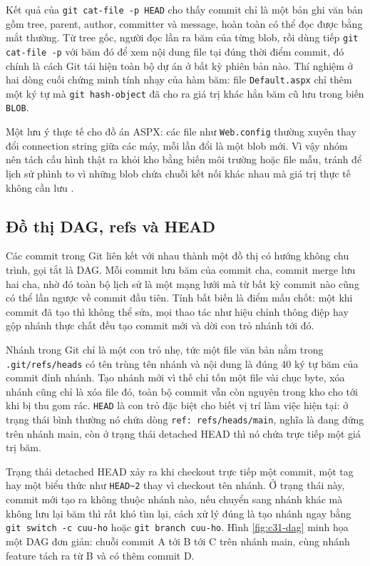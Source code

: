 Kết quả của \verb|git cat-file -p HEAD| cho thấy commit chỉ là một bản ghi văn bản gồm tree, parent, author, committer và message, hoàn toàn có thể đọc được bằng mắt thường.
Từ tree gốc, người đọc lần ra băm của từng blob, rồi dùng tiếp \verb|git cat-file -p| với băm đó để xem nội dung file tại đúng thời điểm commit, đó chính là cách Git tái hiện toàn bộ dự án ở bất kỳ phiên bản nào.
Thí nghiệm ở hai dòng cuối chứng minh tính nhạy của hàm băm: file \verb|Default.aspx| chỉ thêm một ký tự mà \verb|git hash-object| đã cho ra giá trị khác hẳn băm cũ lưu trong biến \verb|BLOB|.

Một lưu ý thực tế cho đồ án ASPX: các file như \verb|Web.config| thường xuyên thay đổi connection string giữa các máy, mỗi lần đổi là một blob mới.
Vì vậy nhóm nên tách cấu hình thật ra khỏi kho bằng biến môi trường hoặc file mẫu, tránh để lịch sử phình to vì những blob chứa chuỗi kết nối khác nhau mà giá trị thực tế không cần lưu \cite{atlassiangit}.

\subsection{Đồ thị DAG, refs và HEAD}
\label{subsec:c31-dag}

Các commit trong Git liên kết với nhau thành một đồ thị có hướng không chu trình, gọi tắt là DAG.
Mỗi commit lưu băm của commit cha, commit merge lưu hai cha, nhờ đó toàn bộ lịch sử là một mạng lưới mà từ bất kỳ commit nào cũng có thể lần ngược về commit đầu tiên.
Tính bất biến là điểm mấu chốt: một khi commit đã tạo thì không thể sửa, mọi thao tác như hiệu chỉnh thông điệp hay gộp nhánh thực chất đều tạo commit mới và dời con trỏ nhánh tới đó.

Nhánh trong Git chỉ là một con trỏ nhẹ, tức một file văn bản nằm trong \verb|.git/refs/heads| có tên trùng tên nhánh và nội dung là đúng 40 ký tự băm của commit đỉnh nhánh.
Tạo nhánh mới vì thế chỉ tốn một file vài chục byte, xóa nhánh cũng chỉ là xóa file đó, toàn bộ commit vẫn còn nguyên trong kho cho tới khi bị thu gom rác.
\verb|HEAD| là con trỏ đặc biệt cho biết vị trí làm việc hiện tại: ở trạng thái bình thường nó chứa dòng \verb|ref: refs/heads/main|, nghĩa là đang đứng trên nhánh main, còn ở trạng thái detached HEAD thì nó chứa trực tiếp một giá trị băm.

Trạng thái detached HEAD xảy ra khi checkout trực tiếp một commit, một tag hay một biểu thức như \verb|HEAD~2| thay vì checkout tên nhánh.
Ở trạng thái này, commit mới tạo ra không thuộc nhánh nào, nếu chuyển sang nhánh khác mà không lưu lại băm thì rất khó tìm lại, cách xử lý đúng là tạo nhánh ngay bằng \verb|git switch -c cuu-ho| hoặc \verb|git branch cuu-ho|.
Hình \ref{fig:c31-dag} minh họa một DAG đơn giản: chuỗi commit A tới B tới C trên nhánh main, cùng nhánh feature tách ra từ B và có thêm commit D.

